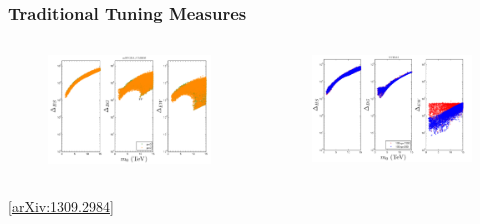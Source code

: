 \documentclass[10pt,aspectratio=169]{beamer}
\begin{document}
\begin{frame}
  \frametitle{Traditional Tuning Measures}
  \begin{columns}[t]
    \begin{column}{0.5\textwidth}
      \begin{figure}
        \centering
        \includegraphics[width=\textwidth]{msugra_measures_comparison}
      \end{figure}
    \end{column}
    \begin{column}{0.5\textwidth}
      \begin{figure}
        \centering
        \includegraphics[width=\textwidth]{nuhm2_measures_comparison}
      \end{figure}
    \end{column}
  \end{columns}
  \begin{center}
    \tiny
        [\href{http://arxiv.org/abs/1309.2984}{arXiv:1309.2984}]
  \end{center}
\end{frame}
\end{document}
